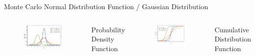 \documentclass[12pt, aspectratio=169]{beamer}
\begin{document}
\begin{frame}{Monte Carlo}
Normal Distribution Function / Gaussian Distribution
\begin{columns}
    \centering
      \begin{figure}
        \includegraphics[width=\textwidth]{1024px-norm.png}
      \end{figure}
      Probability Density Function
     \centering
       \begin{figure}
         \includegraphics[width=\textwidth]{800px-dist.png}
       \end{figure}
       Cumulative Distribution Function
\end{columns}
\end{frame}
\end{document}
